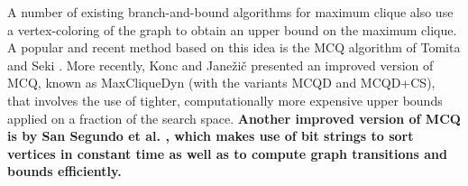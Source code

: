 A number of existing branch-and-bound algorithms for maximum clique
also use a vertex-coloring of the graph to obtain an upper bound on the maximum clique. 
A popular and recent method based on this idea is 
the MCQ algorithm of Tomita and Seki \cite{citeulike:7905505}. 
More recently, Konc and Jane\v{z}i\v{c} \cite{konc2007improved} presented 
an improved version of MCQ, known as MaxCliqueDyn (with the variants MCQD and MCQD+CS), that involves the use of tighter, computationally more expensive upper bounds 
applied on a fraction of the search space. {\bf Another improved version of MCQ is by San Segundo et al. \cite{SanSegundo}, which makes use of bit strings to sort vertices in constant time as well as to compute graph transitions and bounds efficiently.}


